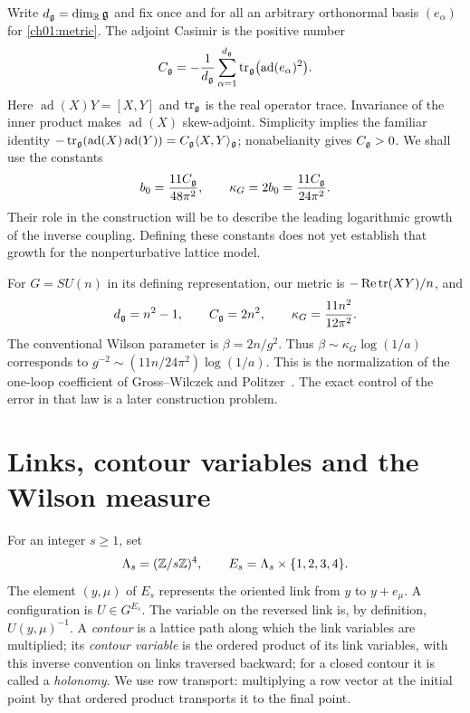 Write $d_{\mathfrak g}=\dim_{\mathbb R}\mathfrak g$ and fix once and for all an arbitrary orthonormal basis $(e_\alpha)$
for \eqref{ch01:metric}. The adjoint Casimir is the positive number
\begin{equation}
 C_{\mathfrak g}=-\frac1{d_{\mathfrak g}}\sum_{\alpha=1}^{d_{\mathfrak g}}
       \operatorname{tr}_{\mathfrak g}\bigl(\operatorname{ad}(e_\alpha)^2\bigr).
 \label{ch01:casimir}
\end{equation}
Here $\operatorname{ad}(X)Y=[X,Y]$ and $\operatorname{tr}_{\mathfrak g}$ is the real operator
trace. Invariance of the inner product makes $\operatorname{ad}(X)$
skew-adjoint. Simplicity implies the familiar identity
$-\operatorname{tr}_{\mathfrak g}(\operatorname{ad}(X)\operatorname{ad}(Y))
=C_{\mathfrak g}\langle X,Y\rangle_{\mathfrak g}$; nonabelianity gives $C_{\mathfrak g}>0$.
We shall use the constants
\begin{equation}
 b_0=\frac{11C_{\mathfrak g}}{48\pi^2},\qquad
 \kappa_G=2b_0=\frac{11C_{\mathfrak g}}{24\pi^2}.
 \label{ch01:slope}
\end{equation}
Their role in the construction will be to describe the leading logarithmic
growth of the inverse coupling. Defining these constants does not yet
establish that growth for the nonperturbative lattice model.

For $G=SU(n)$ in its defining representation, our metric is
$-\operatorname{Re}\operatorname{tr}(XY)/n$, and
\begin{equation}
 d_{\mathfrak g}=n^2-1,\qquad C_{\mathfrak g}=2n^2,\qquad
 \kappa_G=\frac{11n^2}{12\pi^2}.
 \label{ch01:su-n}
\end{equation}
The conventional Wilson parameter is $\beta=2n/g^2$. Thus
$\beta\sim\kappa_G\log(1/a)$ corresponds to
$g^{-2}\sim(11n/24\pi^2)\log(1/a)$.
This is the normalization of the one-loop coefficient of
Gross--Wilczek and Politzer~\cite{GrossWilczek1973,Politzer1973}.
The exact control of the error in that law is a later construction problem.

\section{Links, contour variables and the Wilson measure}
\label{ch01:wilson-section}

For an integer $s\ge1$, set
\[
 \Lambda_s=(\mathbb Z/s\mathbb Z)^4,\qquad
 E_s=\Lambda_s\times\{1,2,3,4\}.
\]
The element $(y,\mu)$ of $E_s$ represents the oriented link from $y$ to
$y+e_\mu$. A configuration is $U\in G^{E_s}$. The variable on the reversed
link is, by definition, $U(y,\mu)^{-1}$. A \emph{contour} is a lattice path along which the link variables are multiplied; its \emph{contour variable} is the ordered
product of its link variables, with this inverse convention on links traversed
backward; for a closed contour it is called a \emph{holonomy}. We use row transport: multiplying a row vector at the initial point
by that ordered product transports it to the final point.

